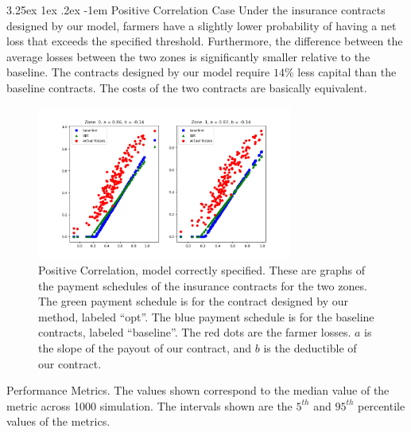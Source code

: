 \documentclass[11pt]{article}
\makeatletter
\renewcommand\paragraph{\@startsection{paragraph}{5}{\z@}%
  {3.25ex \@plus1ex \@minus.2ex}%
  {-1em}%
  {\normalfont\normalsize\bfseries}}
\makeatother
\begin{document}
        \paragraph{Positive Correlation Case} Under the insurance contracts designed by our model, farmers have a slightly lower probability of having a net loss that exceeds the specified threshold. Furthermore, the difference between the average losses between the two zones is significantly smaller relative to the baseline. The contracts designed by our model require $14\%$ less capital than the baseline contracts. The costs of the two contracts are basically equivalent. 
        \begin{figure}[H]
            \centering
            \includegraphics[width=0.75\textwidth]{../../output/figures/Logit_Bootstrap/pos_corr_linear_premium.png}
            \caption{Positive Correlation, model correctly specified. These are graphs of the payment schedules of the insurance contracts for the two zones. The green payment schedule is for the contract designed by our method, labeled ``opt''. The blue payment schedule is for the baseline contracts, labeled ``baseline''. The red dots are the farmer losses. $a$ is the slope of the payout of our contract, and $b$ is the deductible of our contract.}
        \end{figure}

        \begin{table}[H]
            \centering
            
            
            \caption{Performance Metrics. The values shown correspond to the median value of the metric across 1000 simulation. The intervals shown are the $5^{th}$ and $95^{th}$ percentile values of the metrics.}
        \end{table}
        \FloatBarrier
\end{document}
